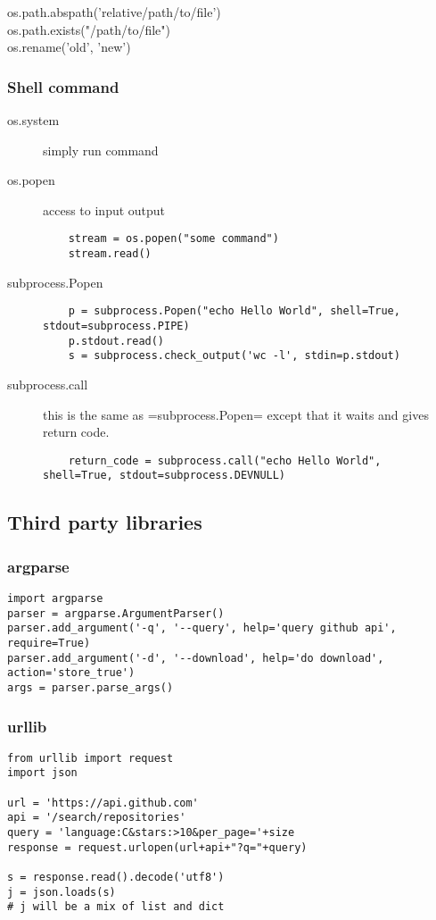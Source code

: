 \begin{description}
\item [os.path.abspath('relative/path/to/file')]
\item [os.path.exists("/path/to/file")]
\item [os.rename('old', 'new')]
\end{description}


\subsubsection{Shell command}
\begin{description}
\item [os.system] simply run command
\item [os.popen] access to input output
  \begin{lstlisting}
    stream = os.popen("some command")
    stream.read()
  \end{lstlisting}
\item [subprocess.Popen]
  \begin{lstlisting}
    p = subprocess.Popen("echo Hello World", shell=True, stdout=subprocess.PIPE)
    p.stdout.read()
    s = subprocess.check_output('wc -l', stdin=p.stdout)
  \end{lstlisting}
\item [subprocess.call] this is the same as =subprocess.Popen= except that it waits and gives return code.
  \begin{lstlisting}
    return_code = subprocess.call("echo Hello World", shell=True, stdout=subprocess.DEVNULL)
  \end{lstlisting}
\end{description}

\subsection{Third party libraries}
\subsubsection{argparse}
\begin{lstlisting}
import argparse
parser = argparse.ArgumentParser()
parser.add_argument('-q', '--query', help='query github api', require=True)
parser.add_argument('-d', '--download', help='do download', action='store_true')
args = parser.parse_args()
\end{lstlisting}

\subsubsection{urllib}
\begin{lstlisting}
from urllib import request
import json

url = 'https://api.github.com'
api = '/search/repositories'
query = 'language:C&stars:>10&per_page='+size
response = request.urlopen(url+api+"?q="+query)

s = response.read().decode('utf8')
j = json.loads(s)
# j will be a mix of list and dict
\end{lstlisting}

